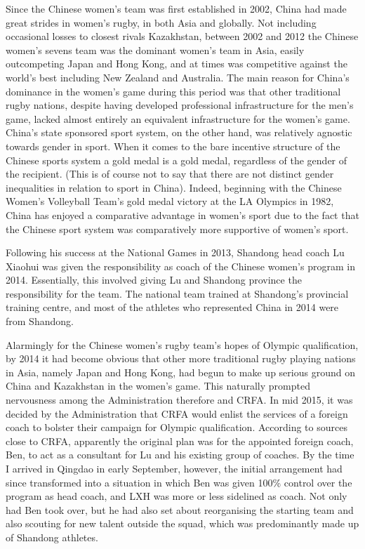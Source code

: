 \begin{CJK}{UTF8}{gbsn}
Since the Chinese women's team was first established in 2002, China had made great strides in women's rugby, in both Asia and globally.  Not including occasional losses to closest rivals Kazakhstan, between 2002 and 2012 the Chinese women's sevens team was the dominant women's team in Asia, easily outcompeting Japan and Hong Kong, and at times was competitive against the world's best including New Zealand and Australia.  The main reason for China's dominance in the women's game during this period was that other traditional rugby nations, despite having developed professional infrastructure for the men's game, lacked almost entirely an equivalent infrastructure for the women's game. China's state sponsored sport system, on the other hand, was relatively agnostic towards gender in sport. When it comes to the bare incentive structure of the Chinese sports system a gold medal is a gold medal, regardless of the gender of the recipient. (This is of course not to say that there are not distinct gender inequalities in relation to sport in China).  Indeed, beginning with the Chinese Women's Volleyball Team's gold medal victory at the LA Olympics in 1982, China has enjoyed a comparative advantage in women's sport due to the fact that the Chinese sport system was comparatively more supportive of women's sport.

Following his success at the National Games in 2013, Shandong head coach Lu Xiaohui was given the responsibility as coach of the Chinese women's program in 2014.  Essentially, this involved giving Lu and  Shandong province the responsibility for the team.  The national team trained at Shandong's provincial training centre, and most of the athletes who represented China in 2014 were from Shandong.

Alarmingly for the Chinese women's rugby team's hopes of Olympic qualification, by 2014 it had become obvious that other more traditional rugby playing nations in Asia, namely Japan and Hong Kong, had begun to make up serious ground on China and Kazakhstan in the women's game.  This naturally prompted nervousness among the Administration therefore and CRFA.  In mid 2015, it was decided by the Administration that CRFA would enlist the services of a foreign coach to bolster their campaign for Olympic qualification.  According to sources close to CRFA, apparently the original plan was for the appointed foreign coach, Ben, to act as a consultant for Lu and his existing group of coaches.  By the time I arrived in Qingdao in early September, however, the initial arrangement had since transformed into a situation in which Ben was given 100\% control over the program as head coach, and LXH was more or less sidelined as coach. Not only had Ben took over, but he had also set about reorganising the starting team and also scouting for new talent outside the squad, which was predominantly made up of Shandong athletes.


\end{CJK}
